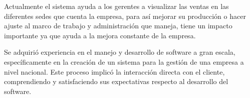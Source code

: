\documentclass[protocolo.tex]{subfiles}
\begin{document}
\begin{enumerate}
Actualmente el sistema ayuda a los gerentes a visualizar las ventas en las diferentes
sedes que cuenta la empresa, para así mejorar su producción o hacer ajuste al marco de
trabajo y administración que maneja, tiene un impacto importante ya que ayuda a la mejora
constante de la empresa.


Se adquirió experiencia en el manejo y desarrollo de software a gran escala, específicamente en la creación de un sistema para la gestión de una empresa a nivel nacional. Este proceso implicó la interacción directa con el cliente, comprendiendo y satisfaciendo sus expectativas respecto al desarrollo del software.


\end{enumerate}
\end{document}
